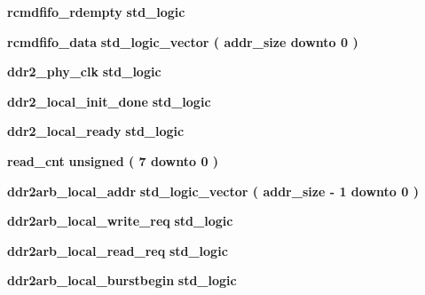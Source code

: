 \begin{DoxyCompactItemize}
\item 
{\bf rcmdfifo\+\_\+rdempty} {\bfseries \textcolor{comment}{std\+\_\+logic}\textcolor{vhdlchar}{ }} 
\item 
{\bf rcmdfifo\+\_\+data} {\bfseries \textcolor{comment}{std\+\_\+logic\+\_\+vector}\textcolor{vhdlchar}{ }\textcolor{vhdlchar}{(}\textcolor{vhdlchar}{ }\textcolor{vhdlchar}{ }\textcolor{vhdlchar}{ }\textcolor{vhdlchar}{ }{\bfseries {\bf addr\+\_\+size}} \textcolor{vhdlchar}{ }\textcolor{keywordflow}{downto}\textcolor{vhdlchar}{ }\textcolor{vhdlchar}{ } \textcolor{vhdldigit}{0} \textcolor{vhdlchar}{ }\textcolor{vhdlchar}{)}\textcolor{vhdlchar}{ }} 
\item 
{\bf ddr2\+\_\+phy\+\_\+clk} {\bfseries \textcolor{comment}{std\+\_\+logic}\textcolor{vhdlchar}{ }} 
\item 
{\bf ddr2\+\_\+local\+\_\+init\+\_\+done} {\bfseries \textcolor{comment}{std\+\_\+logic}\textcolor{vhdlchar}{ }} 
\item 
{\bf ddr2\+\_\+local\+\_\+ready} {\bfseries \textcolor{comment}{std\+\_\+logic}\textcolor{vhdlchar}{ }} 
\item 
{\bf read\+\_\+cnt} {\bfseries \textcolor{comment}{unsigned}\textcolor{vhdlchar}{ }\textcolor{vhdlchar}{(}\textcolor{vhdlchar}{ }\textcolor{vhdlchar}{ } \textcolor{vhdldigit}{7} \textcolor{vhdlchar}{ }\textcolor{keywordflow}{downto}\textcolor{vhdlchar}{ }\textcolor{vhdlchar}{ } \textcolor{vhdldigit}{0} \textcolor{vhdlchar}{ }\textcolor{vhdlchar}{)}\textcolor{vhdlchar}{ }} 
\item 
{\bf ddr2arb\+\_\+local\+\_\+addr} {\bfseries \textcolor{comment}{std\+\_\+logic\+\_\+vector}\textcolor{vhdlchar}{ }\textcolor{vhdlchar}{(}\textcolor{vhdlchar}{ }\textcolor{vhdlchar}{ }\textcolor{vhdlchar}{ }\textcolor{vhdlchar}{ }{\bfseries {\bf addr\+\_\+size}} \textcolor{vhdlchar}{-\/}\textcolor{vhdlchar}{ } \textcolor{vhdldigit}{1} \textcolor{vhdlchar}{ }\textcolor{keywordflow}{downto}\textcolor{vhdlchar}{ }\textcolor{vhdlchar}{ } \textcolor{vhdldigit}{0} \textcolor{vhdlchar}{ }\textcolor{vhdlchar}{)}\textcolor{vhdlchar}{ }} 
\item 
{\bf ddr2arb\+\_\+local\+\_\+write\+\_\+req} {\bfseries \textcolor{comment}{std\+\_\+logic}\textcolor{vhdlchar}{ }} 
\item 
{\bf ddr2arb\+\_\+local\+\_\+read\+\_\+req} {\bfseries \textcolor{comment}{std\+\_\+logic}\textcolor{vhdlchar}{ }} 
\item 
{\bf ddr2arb\+\_\+local\+\_\+burstbegin} {\bfseries \textcolor{comment}{std\+\_\+logic}\textcolor{vhdlchar}{ }} 

\end{DoxyCompactItemize}
